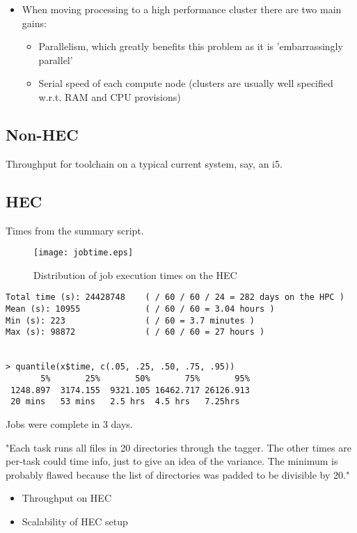 \begin{itemize}
    \item When moving processing to a high performance cluster there are two main gains:
        \begin{itemize}
            \item Parallelism, which greatly benefits this problem as it is 'embarrassingly parallel'
            \item Serial speed of each compute node (clusters are usually well specified w.r.t. RAM and CPU provisions)
        \end{itemize}
\end{itemize}

\subsection{Non-HEC}
Throughput for toolchain on a typical current system, say, an i5.  


\subsection{HEC}
Times from the summary script.


\begin{figure}[h]
\centering
\texttt{[image: jobtime.eps]}
\caption{Distribution of job execution times on the HEC}
\label{fig:jobtimes}
\end{figure}



{\small
\begin{verbatim}
Total time (s): 24428748    ( / 60 / 60 / 24 = 282 days on the HPC )
Mean (s): 10955             ( / 60 / 60 = 3.04 hours )
Min (s): 223                ( / 60 = 3.7 minutes )
Max (s): 98872              ( / 60 / 60 = 27 hours )


> quantile(x$time, c(.05, .25, .50, .75, .95))
       5%       25%       50%       75%       95% 
 1248.897  3174.155  9321.105 16462.717 26126.913 
 20 mins   53 mins   2.5 hrs  4.5 hrs   7.25hrs
\end{verbatim}
}

Jobs were complete in 3 days.

"Each task runs all files in 20 directories through the tagger.  The other times are per-task could time info, just to give an idea of the variance.
The minimum is probably flawed because the list of directories was padded to be divisible by 20."

\begin{itemize}
    \item Throughput on HEC
    \item Scalability of HEC setup
\end{itemize}

